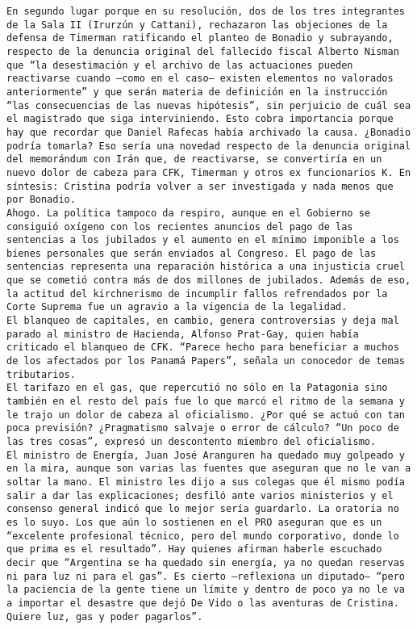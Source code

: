 \documentclass[11pt]{article}
\begin{document}
\begin{Verbatim}[commandchars=\\\{\}]
En segundo lugar porque en su resolución, dos de los tres integrantes de la Sala II (Irurzún y Cattani), rechazaron las objeciones de la defensa de Timerman ratificando el planteo de Bonadio y subrayando, respecto de la denuncia original del fallecido fiscal Alberto Nisman que “la desestimación y el archivo de las actuaciones pueden reactivarse cuando –como en el caso– existen elementos no valorados anteriormente” y que serán materia de definición en la instrucción “las consecuencias de las nuevas hipótesis”, sin perjuicio de cuál sea el magistrado que siga interviniendo. Esto cobra importancia porque hay que recordar que Daniel Rafecas había archivado la causa. ¿Bonadio podría tomarla? Eso sería una novedad respecto de la denuncia original del memorándum con Irán que, de reactivarse, se convertiría en un nuevo dolor de cabeza para CFK, Timerman y otros ex funcionarios K. En síntesis: Cristina podría volver a ser investigada y nada menos que por Bonadio.
Ahogo. La política tampoco da respiro, aunque en el Gobierno se consiguió oxígeno con los recientes anuncios del pago de las sentencias a los jubilados y el aumento en el mínimo imponible a los bienes personales que serán enviados al Congreso. El pago de las sentencias representa una reparación histórica a una injusticia cruel que se cometió contra más de dos millones de jubilados. Además de eso, la actitud del kirchnerismo de incumplir fallos refrendados por la Corte Suprema fue un agravio a la vigencia de la legalidad.
El blanqueo de capitales, en cambio, genera controversias y deja mal parado al ministro de Hacienda, Alfonso Prat-Gay, quien había criticado el blanqueo de CFK. “Parece hecho para beneficiar a muchos de los afectados por los Panamá Papers”, señala un conocedor de temas tributarios.
El tarifazo en el gas, que repercutió no sólo en la Patagonia sino también en el resto del país fue lo que marcó el ritmo de la semana y le trajo un dolor de cabeza al oficialismo. ¿Por qué se actuó con tan poca previsión? ¿Pragmatismo salvaje o error de cálculo? “Un poco de las tres cosas”, expresó un descontento miembro del oficialismo.
El ministro de Energía, Juan José Aranguren ha quedado muy golpeado y en la mira, aunque son varias las fuentes que aseguran que no le van a soltar la mano. El ministro les dijo a sus colegas que él mismo podía salir a dar las explicaciones; desfiló ante varios ministerios y el consenso general indicó que lo mejor sería guardarlo. La oratoria no es lo suyo. Los que aún lo sostienen en el PRO aseguran que es un “excelente profesional técnico, pero del mundo corporativo, donde lo que prima es el resultado”. Hay quienes afirman haberle escuchado decir que “Argentina se ha quedado sin energía, ya no quedan reservas ni para luz ni para el gas”. Es cierto –reflexiona un diputado– “pero la paciencia de la gente tiene un límite y dentro de poco ya no le va a importar el desastre que dejó De Vido o las aventuras de Cristina. Quiere luz, gas y poder pagarlos”.

\end{Verbatim}
\end{document}
